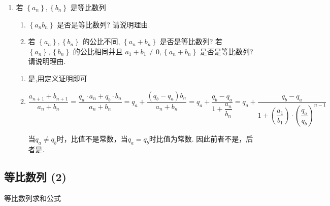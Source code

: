 \begin{enumerate}
\begin{jieda}
\begin{enumerate}
        \end{enumerate}
    \end{jieda}
    
    \item 若 $\left\{  {a}_{n}\right\}  ,\left\{  {b}_{n}\right\}$ 是等比数列
    
    \begin{enumerate}
        \item $\left\{  {{a}_{n}{b}_{n}}\right\}$ 是否是等比数列? 请说明理由.
        \item 若 $\left\{  {a}_{n}\right\}  ,\left\{  {b}_{n}\right\}$ 的公比不同, $\left\{  {{a}_{n} + {b}_{n}}\right\}$ 是否是等比数列? 若 $\left\{  {a}_{n}\right\}  ,\left\{  {b}_{n}\right\}$ 的公比相同并且 ${a}_{1} + {b}_{1} \neq  0,\left\{  {{a}_{n} + {b}_{n}}\right\}$ 是否是等比数列? 请说明理由.
    \end{enumerate}
    \begin{jieda}
        \begin{enumerate}
            \item 是,用定义证明即可
            \item $\dfrac{a_{n+1}+b_{n+1}}{a_n+b_n} = \dfrac{q_a \cdot a_n + q_b \cdot b_n}{a_n+b_n} = q_a + \dfrac{(q_b - q_a)b_n}{a_n+b_n} = q_a + \dfrac{q_b - q_a}{1 + \dfrac{a_n}{b_n}} = q_a + \dfrac{q_b - q_a}{1 + \left(\dfrac{a_1}{b_1}\right) \cdot \left(\dfrac{q_a}{q_b}\right)^{n-1}}$

            当$q_a \neq q_b$时，比值不是常数，当$q_a = q_b$时比值为常数. 因此前者不是，后者是.
        \end{enumerate}
    \end{jieda}

\end{enumerate}



\subsection*{等比数列 (2)}
\zsd 等比数列求和公式

